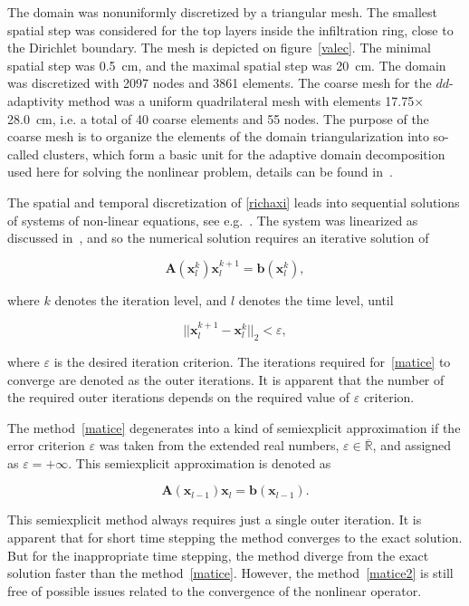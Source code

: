 \documentclass[review]{elsarticle}
\newenvironment{lineq}
    {\begin{linenomath*}
    \begin{equation}
    }
    { 
    \end{equation} 
    \end{linenomath*}
    }
\renewcommand{\vec}{\mathbf}
\begin{document}
 The domain was nonuniformly discretized by a triangular mesh. The smallest spatial step was considered for the top layers inside the infiltration ring, close to the Dirichlet boundary. The mesh is depicted on figure~\ref{valec}. The minimal spatial step was 0.5~cm, and the maximal spatial step was 20~cm. The domain was discretized with 2097 nodes and 3861 elements. The coarse mesh for the $dd$-adaptivity method was a uniform quadrilateral mesh with elements 17.75$\times$28.0~cm, i.e. a total of 40 coarse elements and 55 nodes. The purpose of the coarse mesh is to organize the elements of the domain triangularization into so-called clusters, which form a basic unit for the adaptive domain decomposition used here for solving the nonlinear problem, details can be found in~\citep{mojeamc2}.

 
 The spatial and temporal discretization of \eqref{richaxi} leads into sequential solutions of systems of non-linear equations, see e.g.~\citep{mojecomp}. The system was linearized as discussed in~\citep{mojeacta, mojeamc}, and so the numerical solution requires an iterative solution of 
\begin{lineq}
\label{matice}
\mathbf{A}(\vec{x}_l^k) \vec{x}_l^{k+1} = \vec{b}(\vec{x}_l^k),
\end{lineq}
where $k$ denotes the iteration level, and $l$ denotes the time level, until \begin{lineq} \label{picard} ||\vec{x}_l^{k+1} - \vec{x}_l^k||_2 < \varepsilon , \end{lineq} where $\varepsilon$ is the desired iteration criterion. The iterations required for~\eqref{matice} to converge are denoted as the outer iterations. It is apparent that the number of the required outer iterations depends on the required value of  $\varepsilon$ criterion. 


The method~\eqref{matice} degenerates into a kind of semiexplicit approximation if the error criterion $\varepsilon$ was taken from the extended real numbers, $\varepsilon \in {\overline {\mathbb {R} }}$, and assigned as $\varepsilon = + \infty$. This semiexplicit approximation is denoted as
\begin{lineq}
\label{matice2}
\mathbf{A}(\vec{x}_{l-1}) \vec{x}_l = \vec{b}(\vec{x}_{l-1}).
\end{lineq}
 This semiexplicit method always requires just a single outer iteration. It is apparent that for short time stepping the method converges to the exact solution. But for the inappropriate time stepping, the method diverge from the exact solution faster than the method~\eqref{matice}. However, the method~\eqref{matice2} is still free of possible issues related to the convergence of the nonlinear operator.
\end{document}
